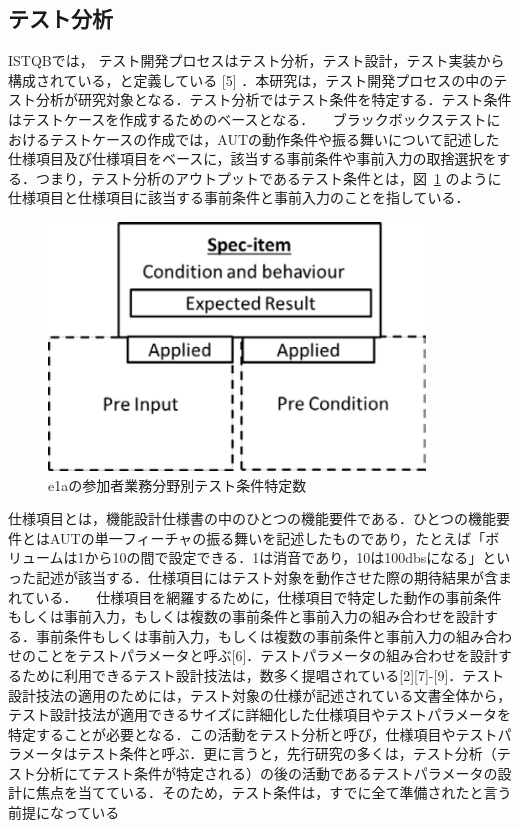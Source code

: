 \documentclass[a4paper,11pt]{jreport}
\begin{document}
\subsection{テスト分析}
ISTQBでは， テスト開発プロセスはテスト分析，テスト設計，テスト実装から構成されている，と定義している [5] ．本研究は，テスト開発プロセスの中のテスト分析が研究対象となる．テスト分析ではテスト条件を特定する．テスト条件はテストケースを作成するためのベースとなる．
　ブラックボックステストにおけるテストケースの作成では，AUTの動作条件や振る舞いについて記述した仕様項目及び仕様項目をベースに，該当する事前条件や事前入力の取捨選択をする．つまり，テスト分析のアウトプットであるテスト条件とは，図~\ref{fig:D-4-Fig1} のように仕様項目と仕様項目に該当する事前条件と事前入力のことを指している．
\begin{figure}[h]
  \begin{center}
  \includegraphics[width=10cm]{./image/D-4-Fig1.png}
  \caption{e1aの参加者業務分野別テスト条件特定数}
  \label{fig:D-4-Fig1}
  \end{center}
   \end{figure}

仕様項目とは，機能設計仕様書の中のひとつの機能要件である．ひとつの機能要件とはAUTの単一フィーチャの振る舞いを記述したものであり，たとえば「ボリュームは1から10の間で設定できる．1は消音であり，10は100dbsになる」といった記述が該当する．仕様項目にはテスト対象を動作させた際の期待結果が含まれている．
　仕様項目を網羅するために，仕様項目で特定した動作の事前条件もしくは事前入力，もしくは複数の事前条件と事前入力の組み合わせを設計する．事前条件もしくは事前入力，もしくは複数の事前条件と事前入力の組み合わせのことをテストパラメータと呼ぶ[6]．テストパラメータの組み合わせを設計するために利用できるテスト設計技法は，数多く提唱されている[2][7]-[9]．テスト設計技法の適用のためには，テスト対象の仕様が記述されている文書全体から，テスト設計技法が適用できるサイズに詳細化した仕様項目やテストパラメータを特定することが必要となる．この活動をテスト分析と呼び，仕様項目やテストパラメータはテスト条件と呼ぶ．更に言うと，先行研究の多くは，テスト分析（テスト分析にてテスト条件が特定される）の後の活動であるテストパラメータの設計に焦点を当てている．そのため，テスト条件は，すでに全て準備されたと言う前提になっている
\end{document}
